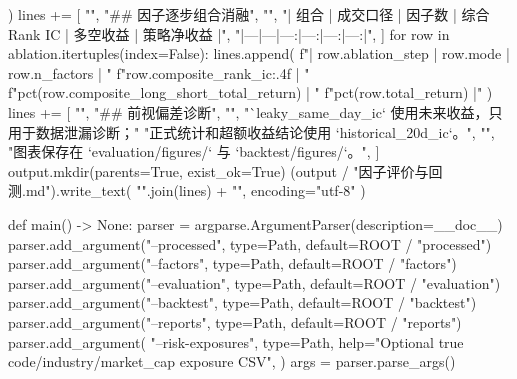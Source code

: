 \documentclass[UTF8,a4paper,fontset=fandol]{ctexart}
\begin{document}
\begin{ProjectCode}
{        )
    lines += [
        "",
        "## 因子逐步组合消融",
        "",
        "| 组合 | 成交口径 | 因子数 | 综合Rank IC | 多空收益 | 策略净收益 |",
        "|---|---|---:|---:|---:|---:|",
    ]
    for row in ablation.itertuples(index=False):
        lines.append(
            f"| {row.ablation_step} | {row.mode} | {row.n_factors} | "
            f"{row.composite_rank_ic:.4f} | "
            f"{pct(row.composite_long_short_total_return)} | "
            f"{pct(row.total_return)} |"
        )
    lines += [
        "",
        "## 前视偏差诊断",
        "",
        "`leaky_same_day_ic` 使用未来收益，只用于数据泄漏诊断；"
        "正式统计和超额收益结论使用 `historical_20d_ic`。",
        "",
        "图表保存在 `evaluation/figures/` 与 `backtest/figures/`。",
    ]
    output.mkdir(parents=True, exist_ok=True)
    (output / "因子评价与回测.md").write_text(
        "\n".join(lines) + "\n", encoding="utf-8"
    )


def main() -> None:
    parser = argparse.ArgumentParser(description=__doc__)
    parser.add_argument("--processed", type=Path, default=ROOT / "processed")
    parser.add_argument("--factors", type=Path, default=ROOT / "factors")
    parser.add_argument("--evaluation", type=Path, default=ROOT / "evaluation")
    parser.add_argument("--backtest", type=Path, default=ROOT / "backtest")
    parser.add_argument("--reports", type=Path, default=ROOT / "reports")
    parser.add_argument(
        "--risk-exposures",
        type=Path,
        help="Optional true code/industry/market_cap exposure CSV",
    )
    args = parser.parse_args()

}
\end{ProjectCode}
\end{document}
